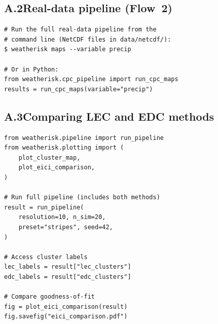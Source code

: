 \documentclass[preprint,12pt,a4paper]{elsarticle}
\begin{document}
\subsection{A.2\quad Real-data pipeline (Flow~2)}

\begin{lstlisting}[caption={CPC precipitation clustering via
  CLI.}, label=lst:app-cpc-cli]
# Run the full real-data pipeline from the
# command line (NetCDF files in data/netcdf/):
$ weatherisk maps --variable precip

# Or in Python:
from weatherisk.cpc_pipeline import run_cpc_maps
results = run_cpc_maps(variable="precip")
\end{lstlisting}

\subsection{A.3\quad Comparing LEC and EDC methods}

\begin{lstlisting}[caption={Running both clustering methods
  and comparing results.}, label=lst:app-compare]
from weatherisk.pipeline import run_pipeline
from weatherisk.plotting import (
    plot_cluster_map,
    plot_eici_comparison,
)

# Run full pipeline (includes both methods)
result = run_pipeline(
    resolution=10, n_sim=20,
    preset="stripes", seed=42,
)

# Access cluster labels
lec_labels = result["lec_clusters"]
edc_labels = result["edc_clusters"]

# Compare goodness-of-fit
fig = plot_eici_comparison(result)
fig.savefig("eici_comparison.pdf")
\end{lstlisting}
\end{document}
